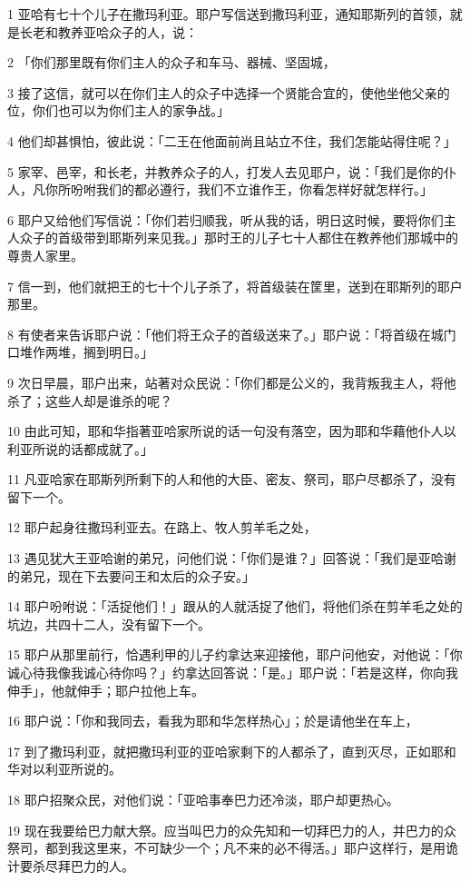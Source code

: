 \par 1 亚哈有七十个儿子在撒玛利亚。耶户写信送到撒玛利亚，通知耶斯列的首领，就是长老和教养亚哈众子的人，说：
\par 2 「你们那里既有你们主人的众子和车马、器械、坚固城，
\par 3 接了这信，就可以在你们主人的众子中选择一个贤能合宜的，使他坐他父亲的位，你们也可以为你们主人的家争战。」
\par 4 他们却甚惧怕，彼此说：「二王在他面前尚且站立不住，我们怎能站得住呢？」
\par 5 家宰、邑宰，和长老，并教养众子的人，打发人去见耶户，说：「我们是你的仆人，凡你所吩咐我们的都必遵行，我们不立谁作王，你看怎样好就怎样行。」
\par 6 耶户又给他们写信说：「你们若归顺我，听从我的话，明日这时候，要将你们主人众子的首级带到耶斯列来见我。」那时王的儿子七十人都住在教养他们那城中的尊贵人家里。
\par 7 信一到，他们就把王的七十个儿子杀了，将首级装在筐里，送到在耶斯列的耶户那里。
\par 8 有使者来告诉耶户说：「他们将王众子的首级送来了。」耶户说：「将首级在城门口堆作两堆，搁到明日。」
\par 9 次日早晨，耶户出来，站著对众民说：「你们都是公义的，我背叛我主人，将他杀了；这些人却是谁杀的呢？
\par 10 由此可知，耶和华指著亚哈家所说的话一句没有落空，因为耶和华藉他仆人以利亚所说的话都成就了。」
\par 11 凡亚哈家在耶斯列所剩下的人和他的大臣、密友、祭司，耶户尽都杀了，没有留下一个。
\par 12 耶户起身往撒玛利亚去。在路上、牧人剪羊毛之处，
\par 13 遇见犹大王亚哈谢的弟兄，问他们说：「你们是谁？」回答说：「我们是亚哈谢的弟兄，现在下去要问王和太后的众子安。」
\par 14 耶户吩咐说：「活捉他们！」跟从的人就活捉了他们，将他们杀在剪羊毛之处的坑边，共四十二人，没有留下一个。
\par 15 耶户从那里前行，恰遇利甲的儿子约拿达来迎接他，耶户问他安，对他说：「你诚心待我像我诚心待你吗？」约拿达回答说：「是。」耶户说：「若是这样，你向我伸手」，他就伸手；耶户拉他上车。
\par 16 耶户说：「你和我同去，看我为耶和华怎样热心」；於是请他坐在车上，
\par 17 到了撒玛利亚，就把撒玛利亚的亚哈家剩下的人都杀了，直到灭尽，正如耶和华对以利亚所说的。
\par 18 耶户招聚众民，对他们说：「亚哈事奉巴力还冷淡，耶户却更热心。
\par 19 现在我要给巴力献大祭。应当叫巴力的众先知和一切拜巴力的人，并巴力的众祭司，都到我这里来，不可缺少一个；凡不来的必不得活。」耶户这样行，是用诡计要杀尽拜巴力的人。

